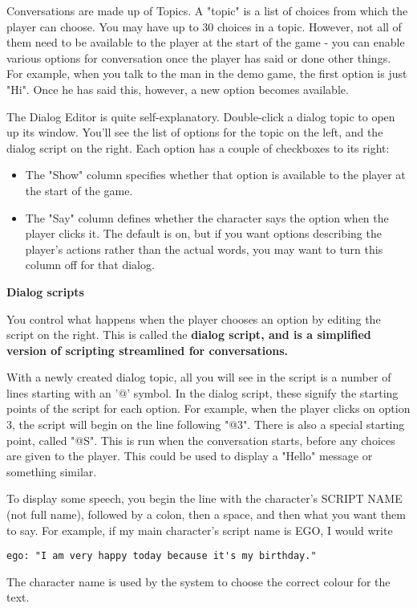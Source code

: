 Conversations are made up of Topics. A "topic" is a list of choices from
which the player can choose. You may have up to 30 choices in a topic.
However, not all of them need to be available to the player at the start of the
game - you can enable various options for conversation once the player has
said or done other things. For example, when you talk to the man in the demo
game, the first option is just "Hi". Once he has said this, however, a new
option becomes available.

The Dialog Editor is quite self-explanatory. Double-click a dialog topic
to open up its window. You'll see the list of options for the topic on
the left, and the dialog script on the right. Each option
has a couple of checkboxes to its right:
\begin{itemize}\itemsep=0pt
\item The "Show" column specifies whether that option is available to the player
at the start of the game.
\item The "Say" column defines whether the character
says the option when the player clicks it. The default is on, but if you
want options describing the player's actions rather than the actual words,
you may want to turn this column off for that dialog.
\end{itemize}
\bf{Dialog scripts}

You control what happens when the player chooses an option by editing
the script on the right. This is called the \bf{dialog script}, and is a
simplified version of scripting streamlined for conversations.

With a newly created dialog topic, all you will see in the script is a number
of lines starting with an '@' symbol. In the dialog script, these signify the starting points of
the script for each option. For example, when the player clicks on option 3,
the script will begin on the line following "@3". There is also a special
starting point, called "@S". This is run when the conversation starts, before
any choices are given to the player. This could be used to display a "Hello"
message or something similar.

To display some speech, you begin the line with the character's SCRIPT NAME
(not full name), followed by a colon, then a space, and then what you want
them to say. For example, if my main character's script name is EGO, I would
write
\begin{verbatim}
ego: "I am very happy today because it's my birthday."
\end{verbatim}
The character name is used by the system to choose the correct colour for
the text.


